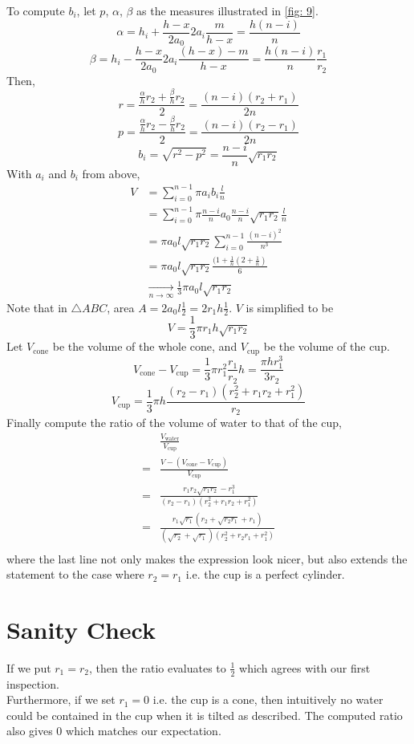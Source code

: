 \documentclass[a4paper]{article}
\begin{document}
To compute $b_i$, let $p$, $\alpha$, $\beta$ as the measures illustrated in \ref{fig: 9}.
\[\alpha = h_i + \frac{h-x}{2a_0}2 a_i \frac{m}{h-x} = \frac{h(n-i)}{n}\]
\[\beta = h_i - \frac{h-x}{2a_0}2a_i\frac{(h-x)-m}{h-x} = \frac{h(n-i)}{n}\frac{r_1}{r_2}\]
Then,
\[r = \frac{\frac{\alpha}{h}r_2 + \frac{\beta}{h}r_2}{2} = \frac{(n-i)(r_2+r_1)}{2n}\]
\[p = \frac{\frac{\alpha}{h}r_2 - \frac{\beta}{h}r_2}{2} = \frac{(n-i)(r_2-r_1)}{2n}\]
\[b_i = \sqrt{r^2 - p^2} = \frac{n-i}{n}\sqrt{r_1r_2}\]
With $a_i$ and $b_i$ from above, 
\begin{align*}
V &= \sum_{i=0}^{n-1} \pi a_i b_i \frac{l}{n}\\
&= \sum_{i=0}^{n-1}\pi \frac{n-i}{n}a_0\frac{n-i}{n}\sqrt{r_1r_2}\frac{l}{n}\\
&= \pi a_0 l \sqrt{r_1r_2}\sum_{i=0}^{n-1}\frac{(n-i)^2}{n^3}\\
&= \pi a_0 l\sqrt{r_1r_2}\frac{(1+\frac{1}{n}(2+\frac{1}{n})}{6} \\
&\xrightarrow[n \to \infty]{} \frac{1}{3}\pi a_0 l \sqrt{r_1r_2}
\end{align*}
Note that in $\bigtriangleup ABC$, area $A = 2a_0 l \frac{1}{2} = 2r_1 h \frac{1}{2}$. $V$ is simplified to be
\[V = \frac{1}{3}\pi r_1 h\sqrt{r_1r_2}\]
Let $V_{\text{cone}}$ be the volume of the whole cone, and $V_{\text{cup}}$ be the volume of the cup.
\[V_{\text{cone}} - V_{\text{cup}} = \frac{1}{3}\pi r_1^2\frac{r_1}{r_2}h = \frac{\pi h r_1^3}{3r_2}\]
\[V_{\text{cup}} = \frac{1}{3}\pi h\frac{(r_2-r_1)(r_2^2+r_1r_2+r_1^2)}{r_2}\]
Finally compute the ratio of the volume of water to that of the cup, 
\begin{align*}
&\frac{V_\text{water}}{V_\text{cup}} \\
= &\frac{V - (V_\text{cone} - V_\text{cup})}{V_\text{cup}}\\
= & \frac{r_1r_2\sqrt{r_1r_2} - r_1^3}{(r_2-r_1)(r_2^2 + r_1r_2 + r_1^2)}\\
= & \frac{r_1\sqrt{r_1}(r_2+\sqrt{r_2r_1} + r_1)}{(\sqrt{r_2} + \sqrt{r_1})(r_2^2 + r_2r_1 + r_1^2)}\\
\end{align*}
where the last line not only makes the expression look nicer, but also extends the statement to the case where $r_2 = r_1$ i.e. the cup is a perfect cylinder.



\section{Sanity Check}
If we put $r_1 = r_2$, then the ratio evaluates to $\frac{1}{2}$ which agrees with our first inspection.\\
Furthermore, if we set $r_1 = 0$ i.e. the cup is a cone, then intuitively no water could be contained in the cup when it is tilted as described. The computed ratio also gives $0$ which matches our expectation.\\
\end{document}
